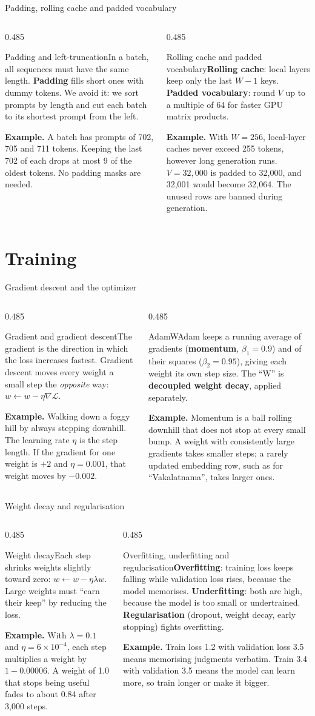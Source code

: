 \documentclass[aspectratio=169,11pt]{beamer}
\newcommand{\term}[3]{%
  \begin{block}{#1}\small #2\par\vspace{1mm}%
  {\color{exgreen}\textbf{Example.}} #3\end{block}}
\newcommand{\twoterms}[6]{%
  \begin{columns}[T]
    \begin{column}{0.485\textwidth}\term{#1}{#2}{#3}\end{column}
    \begin{column}{0.485\textwidth}\term{#4}{#5}{#6}\end{column}
  \end{columns}}
\begin{document}
\begin{frame}{Padding, rolling cache and padded vocabulary}
  \twoterms{Padding and left-truncation}
  {In a batch, all sequences must have the same length. \textbf{Padding} fills short ones with dummy tokens. We avoid it: we sort prompts by length and cut each batch to its shortest prompt from the left.}
  {A batch has prompts of 702, 705 and 711 tokens. Keeping the last 702 of each drops at most 9 of the oldest tokens. No padding masks are needed.}
  {Rolling cache and padded vocabulary}
  {\textbf{Rolling cache}: local layers keep only the last $W-1$ keys. \textbf{Padded vocabulary}: round $V$ up to a multiple of 64 for faster GPU matrix products.}
  {With $W=256$, local-layer caches never exceed 255 tokens, however long generation runs. $V=32{,}000$ is padded to 32,000, and 32,001 would become 32,064. The unused rows are banned during generation.}
\end{frame}

\section{Training}

\begin{frame}{Gradient descent and the optimizer}
  \twoterms{Gradient and gradient descent}
  {The gradient is the direction in which the loss increases fastest. Gradient descent moves every weight a small step the \emph{opposite} way: $w\leftarrow w-\eta\nabla\mathcal{L}$.}
  {Walking down a foggy hill by always stepping downhill. The learning rate $\eta$ is the step length. If the gradient for one weight is $+2$ and $\eta=0.001$, that weight moves by $-0.002$.}
  {AdamW}
  {Adam keeps a running average of gradients (\textbf{momentum}, $\beta_1=0.9$) and of their squares ($\beta_2=0.95$), giving each weight its own step size. The ``W'' is \textbf{decoupled weight decay}, applied separately.}
  {Momentum is a ball rolling downhill that does not stop at every small bump. A weight with consistently large gradients takes smaller steps; a rarely updated embedding row, such as for ``Vakalatnama'', takes larger ones.}
\end{frame}

\begin{frame}{Weight decay and regularisation}
  \twoterms{Weight decay}
  {Each step shrinks weights slightly toward zero: $w\leftarrow w-\eta\lambda w$. Large weights must ``earn their keep'' by reducing the loss.}
  {With $\lambda=0.1$ and $\eta=6\times10^{-4}$, each step multiplies a weight by $1-0.00006$. A weight of 1.0 that stops being useful fades to about 0.84 after 3,000 steps.}
  {Overfitting, underfitting and regularisation}
  {\textbf{Overfitting}: training loss keeps falling while validation loss rises, because the model memorises. \textbf{Underfitting}: both are high, because the model is too small or undertrained. \textbf{Regularisation} (dropout, weight decay, early stopping) fights overfitting.}
  {Train loss 1.2 with validation loss 3.5 means memorising judgments verbatim. Train 3.4 with validation 3.5 means the model can learn more, so train longer or make it bigger.}
\end{frame}
\end{document}
